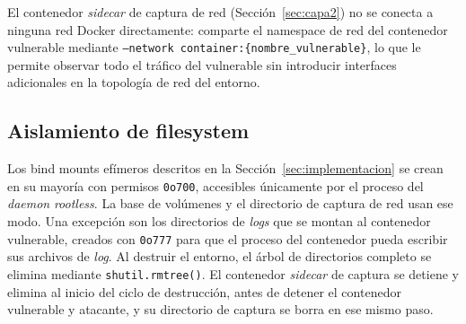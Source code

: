 El contenedor \textit{sidecar} de captura de red (Sección~\ref{sec:capa2}) no se
conecta a ninguna red Docker directamente: comparte el namespace de red del
contenedor vulnerable mediante \texttt{--network container:\{nombre\_vulnerable\}},
lo que
le permite observar todo el tráfico del vulnerable sin introducir interfaces
adicionales en la topología de red del entorno.

\subsection*{Aislamiento de filesystem}

Los bind mounts efímeros descritos en la Sección~\ref{sec:implementacion} se
crean en su mayoría con permisos \texttt{0o700}, accesibles únicamente por el
proceso del \textit{daemon} \textit{rootless}. La base de volúmenes y el
directorio de captura de red usan ese modo. Una excepción son los directorios de
\textit{logs} que se montan al contenedor vulnerable, creados con \texttt{0o777}
para que el proceso del contenedor pueda escribir sus archivos de \textit{log}.
Al destruir el entorno, el árbol
de directorios completo se elimina mediante \texttt{shutil.rmtree()}. El
contenedor \textit{sidecar} de captura se detiene y elimina al inicio del ciclo
de destrucción, antes de detener el contenedor vulnerable y atacante, y su
directorio de captura se borra en ese mismo paso.
